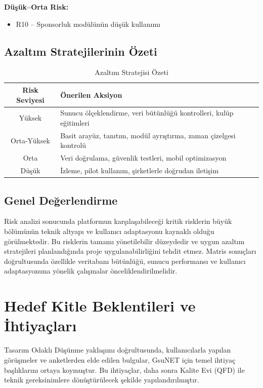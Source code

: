\documentclass[a4paper,12pt]{report}
\begin{document}
\textbf{Düşük–Orta Risk:}
\begin{itemize}
    \item R10 – Sponsorluk modülünün düşük kullanımı
\end{itemize}

\subsection{Azaltım Stratejilerinin Özeti}

\begin{table}[H]
\centering
\caption{Azaltım Stratejisi Özeti}
\begin{tabular}{c p{10cm}}
\toprule
\textbf{Risk Seviyesi} & \textbf{Önerilen Aksiyon} \\
\midrule
Yüksek & Sunucu ölçeklendirme, veri bütünlüğü kontrolleri, kulüp eğitimleri \\
Orta-Yüksek & Basit arayüz, tanıtım, modül ayrıştırma, zaman çizelgesi kontrolü \\
Orta & Veri doğrulama, güvenlik testleri, mobil optimizasyon \\
Düşük & İzleme, pilot kullanım, şirketlerle doğrudan iletişim \\
\bottomrule
\end{tabular}
\end{table}

\subsection{Genel Değerlendirme}

Risk analizi sonucunda platformun karşılaşabileceği kritik risklerin büyük bölümünün teknik altyapı ve kullanıcı adaptasyonu kaynaklı olduğu görülmektedir. Bu risklerin tamamı yönetilebilir düzeydedir ve uygun azaltım stratejileri planlandığında proje uygulanabilirliğini tehdit etmez. Matris sonuçları doğrultusunda özellikle veritabanı bütünlüğü, sunucu performansı ve kullanıcı adaptasyonuna yönelik çalışmalar önceliklendirilmelidir.


\section{Hedef Kitle Beklentileri ve İhtiyaçları}

Tasarım Odaklı Düşünme yaklaşımı doğrultusunda, kullanıcılarla yapılan görüşmeler ve anketlerden elde edilen bulgular, GsuNET için temel ihtiyaç başlıklarını ortaya koymuştur. Bu ihtiyaçlar, daha sonra Kalite Evi (QFD) ile teknik gereksinimlere dönüştürülecek şekilde yapılandırılmıştır.
\end{document}
